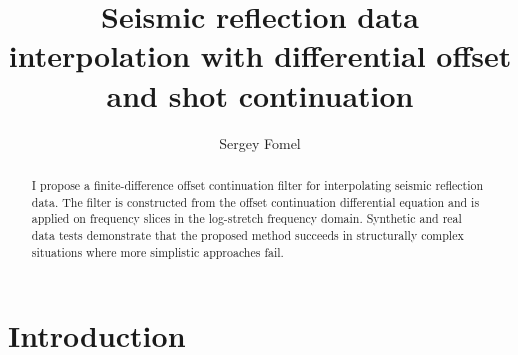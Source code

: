 \title{Seismic reflection data interpolation with differential offset
and shot continuation}

\author{Sergey Fomel}

\maketitle

\begin{abstract}
I propose a finite-difference offset continuation filter for
  interpolating seismic reflection data. The filter is constructed
  from the offset continuation differential equation and is applied on
  frequency slices in the log-stretch frequency domain.  Synthetic and
  real data tests demonstrate that the proposed method succeeds in
  structurally complex situations where more simplistic approaches
  fail.
\end{abstract}

\section{Introduction}

